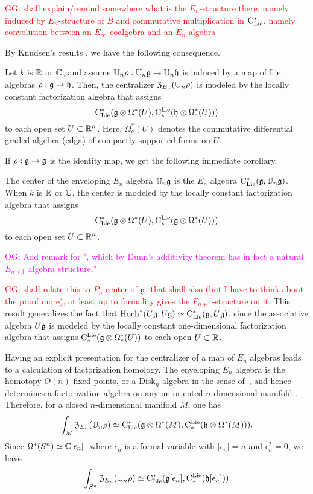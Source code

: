 \documentclass[11pt]{amsart}
\numberwithin{equation}{section}
\def\owen{\textcolor{magenta}{OG: }\textcolor{magenta}}
\def\greg{\textcolor{red}{GG: }\textcolor{red}}
\begin{document}
\greg{shall explain/remind somewhere what is the $E_n$-structure there: namely induced by $E_n$-structure of $B$ and commutative multiplication in ${\rm C}_{\rm Lie}^*$, namely convolution between an $E_\infty$-coalgebra and an $E_n$-algebra}

By Knudsen's results \cite{Knudsen}, we have the following consequence.

\begin{cor}
Let $k$ is $\mathbb R$ or $\mathbb C$, and assume $\mathbb U_n \rho:  \mathbb U_n \mathfrak g \to \mathbb U_n \mathfrak h$ is induced by a map of Lie algebras $\rho: \mathfrak g \to \mathfrak h$.  Then, the centralizer ${\frak Z}_{E_n}(\mathbb U_n \rho)$ is modeled by the locally constant factorization algebra that assigns
\[
{\rm C}_{\rm Lie}^*(\mathfrak g \otimes \Omega^*(U), {\rm C}^{\rm Lie}_*( \mathfrak h \otimes \Omega^*_c(U)))
\]
to each open set $U \subset \mathbb R^n$. Here, $\Omega^*_c(U)$ denotes the commutative differential graded algebra (cdga) of compactly supported forms on $U$.
\end{cor}

If $\rho: \mathfrak g \to \mathfrak g$ is the identity map, we get the following immediate corollary.

\begin{cor}
\label{thm: center}
The center of the enveloping $E_n$ algebra $\mathbb U_n\mathfrak g$ is the $E_n$ algebra ${\rm C}_{\rm Lie}^*(\mathfrak g, \mathbb U_n\mathfrak g)$. 
When $k$ is $\mathbb R$ or $\mathbb C$, the 
center is modeled by the locally constant factorization algebra that assigns
\[
{\rm C}_{\rm Lie}^*(\mathfrak g \otimes \Omega^*(U), {\rm C}^{\rm Lie}_*( \mathfrak g \otimes \Omega^*_c(U)))
\]
to each open set $U \subset \mathbb R^n$.
\end{cor}

\owen{Add remark for ", which by Dunn's additivity theorem has in fact a natural $E_{n+1}$ algebra structure."}

\greg{shall relate this to $P_n$-center of $\mathfrak g$. that shall also (but I have to think about the proof more), at least up to formality gives the $P_{n+1}$-structure on it. }
This result generalizes the fact that ${\rm Hoch}^*(U\mathfrak g,U\mathfrak g) \simeq {\rm C}_{\rm Lie}^*(\mathfrak g, U\mathfrak g)$, since the associative algebra $U\mathfrak g$ is modeled by the locally constant one-dimensional factorization algebra that assigns ${\rm C}^{\rm Lie}_* (\mathfrak g \otimes \Omega^*_c(U))$ to each open $U \subset \mathbb R$. 

Having an explicit presentation for the centralizer of a map of $E_n$ algebras leads to a calculation of factorization homology. The enveloping $E_n$ algebra is the homotopy $O(n)$-fixed points, or a $\mathrm{Disk}_n$-algebra in the sense of~\cite{AF}, and hence determines a factorization algebra on any un-oriented $n$-dimensional manifold \cite{Knudsen}. Therefore, for a closed $n$-dimensional manifold $M$, one has
\[
\int_M {\frak Z}_{E_n}(\mathbb U_n \rho) \simeq {\rm C}_{\rm Lie}^*(\mathfrak g \otimes \Omega^*(M), {\rm C}^{\rm Lie}_*( \mathfrak h \otimes \Omega^*(M))).
\]
Since $\Omega^*(S^n) \simeq \mathbb C[\epsilon_n]$, where $\epsilon_n$ is a formal variable with $|\epsilon_n| = n$ and $\epsilon_n^2 = 0$, we have
\[
\int_{S^n} {\frak Z}_{E_n}(\mathbb U_n \rho) \simeq {\rm C}_{\rm Lie}^*(\mathfrak g[\epsilon_n], {\rm C}^{\rm Lie}_*( \mathfrak h[\epsilon_n]))
\]
\end{document}
